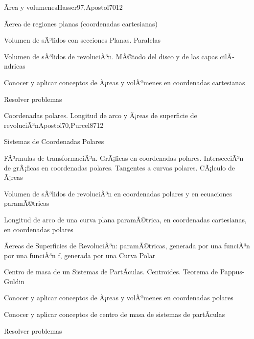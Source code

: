 \begin{syllabus}
\begin{unit}{Ãrea y volumenes}{Hasser97,Apostol70}{12}
\begin{topics}
      \item Ãerea de regiones planas (coordenadas cartesianas)
      \item Volumen de sÃ³lidos con secciones Planas. Paralelas
      \item Volumen de sÃ³lidos de revoluciÃ³n. MÃ©todo del disco y de las capas cilÃ­ndricas
\end{topics}

\begin{unitgoals}
	\item Conocer y aplicar conceptos de Ã¡reas y volÃºmenes en coordenadas cartesianas
	\item Resolver problemas
\end{unitgoals}
\end{unit}

\begin{unit}{Coordenadas polares. Longitud de arco y Ã¡reas de superficie de revoluciÃ³n}{Apostol70,Purcel87}{12}
\begin{topics}
	\item Sistemas de Coordenadas Polares
	\item FÃ³rmulas de transformaciÃ³n. GrÃ¡ficas en coordenadas polares. IntersecciÃ³n de grÃ¡ficas en coordenadas polares. Tangentes a curvas polares. CÃ¡lculo de Ã¡reas
	\item Volumen de sÃ³lidos de revoluciÃ³n en coordenadas polares y en ecuaciones paramÃ©tricas
	\item Longitud de arco de una curva plana paramÃ©trica, en coordenadas cartesianas, en  coordenadas polares
	\item Ãereas de Superficies de RevoluciÃ³n: paramÃ©tricas,  generada por una funciÃ³n por una  funciÃ³n f, generada por una Curva  Polar
	\item Centro de masa de un Sistemas de PartÃ­culas. Centroides. Teorema de Pappus-Guldin
\end{topics}

\begin{unitgoals}
	\item Conocer y aplicar conceptos de Ã¡reas y volÃºmenes en coordenadas polares
	\item Conocer y aplicar conceptos de centro de masa de sistemas de partÃ­culas
	\item Resolver problemas
\end{unitgoals}
\end{unit}


\end{syllabus}
